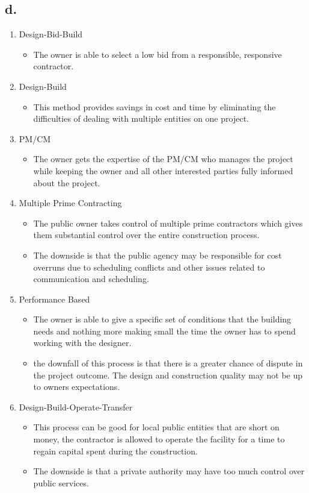 \documentclass[12pt]{article}
\renewcommand{\=}[1]{\stackrel{#1}{=}} %
\theoremstyle{definition}
\theoremstyle{remark}
\begin{document}
\subsection{d.}
\begin{enumerate}
	\item Design-Bid-Build
	\begin{itemize}
		\item The owner is able to select a low bid from a responsible, responsive contractor.
	\end{itemize}
	\item Design-Build
	\begin{itemize}
		\item This method provides savings in cost and time by eliminating the difficulties of dealing with multiple entities on one project.
	\end{itemize}
	\item PM/CM
	\begin{itemize}
		\item The owner gets the expertise of the PM/CM who manages the project while keeping the owner and all other interested parties fully informed about the project.
	\end{itemize}
	\item Multiple Prime Contracting
	\begin{itemize}
		\item The public owner takes control of multiple prime contractors which gives them substantial control over the entire construction process.
		\item The downside is that the public agency may be responsible for cost overruns due to scheduling conflicts and other issues related to communication and scheduling.
	\end{itemize}
	\item Performance Based
	\begin{itemize}
		\item The owner is able to give a specific set of conditions that the building needs and nothing more making small the time the owner has to spend working with the designer.
		\item the downfall of this process is that there is a greater chance of dispute in the project outcome. The design and construction quality may not be up to owners expectations.
	\end{itemize}
	\item Design-Build-Operate-Transfer
	\begin{itemize}
		\item This process can be good for local public entities that are short on money, the contractor is allowed to operate the facility for a time to regain capital spent during the construction.
		\item The downside is that a private authority may have too much control over public services.
	\end{itemize}
\end{enumerate}
\end{document}

